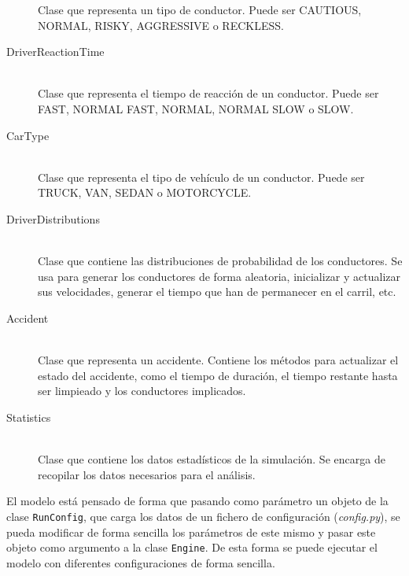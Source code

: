 \begin{description}
        Clase que representa un tipo de conductor. Puede ser CAUTIOUS, NORMAL, RISKY, AGGRESSIVE o RECKLESS.
    \item[DriverReactionTime] \hfill \\
        Clase que representa el tiempo de reacción de un conductor. Puede ser FAST, NORMAL FAST, NORMAL, NORMAL SLOW o SLOW.
    \item[CarType] \hfill \\
        Clase que representa el tipo de vehículo de un conductor. Puede ser TRUCK, VAN, SEDAN o MOTORCYCLE.
    \item[DriverDistributions] \hfill \\
        Clase que contiene las distribuciones de probabilidad de los conductores. Se usa para generar los conductores de forma aleatoria,
        inicializar y actualizar sus velocidades, generar el tiempo que han de permanecer en el carril, etc.
    \item[Accident] \hfill \\
        Clase que representa un accidente. Contiene los métodos para actualizar el estado del accidente, como el tiempo de duración,
        el tiempo restante hasta ser limpieado y los conductores implicados.
    \item[Statistics] \hfill \\
        Clase que contiene los datos estadísticos de la simulación. Se encarga de recopilar los datos necesarios para el análisis.
\end{description}

El modelo está pensado de forma que pasando como parámetro un objeto de la clase \texttt{RunConfig}, que carga los datos de un fichero
de configuración (\textit{config.py}), se pueda modificar de forma sencilla los parámetros de este mismo y pasar este objeto como
argumento a la clase \texttt{Engine}. De esta forma se puede ejecutar el modelo con diferentes configuraciones de forma sencilla.
